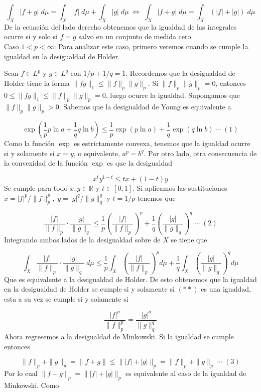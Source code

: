 \documentclass[12pt]{article}
\begin{document}
    \[\int_X |f+g|\; d\mu = \int_X |f|\; d\mu+\int_X |g|\; d\mu\;\Leftrightarrow\;\int_X |f+g|\; d\mu = \int_X(|f|+|g|)\;d\mu\]
    De la ecuaci\'on del lado derecho obtenemos que la igualdad de las integrales ocurre 
    si y solo si $f = g$ salvo en un conjunto de medida cero.
    \\

    Caso $1 < p < \infty$: Para analizar este caso, primero veremos cuando se cumple la 
    igualdad en la desigualdad de Holder.

    Sean $f\in L^p$ y $g\in L^q$ con $1/p+1/q = 1$. Recordemos que la desigualdad de Holder
    tiene la forma $\|fg\|_1 \leq \|f\|_p\|g\|_p$. Si $\|f\|_p\|g\|_p = 0$, entonces 
    $0 \leq \|fg\|_1 \leq \|f\|_p\|g\|_p = 0$, luego ocurre la igualdad. Supongamos que 
    $\|f\|_p\|g\|_p > 0$. Sabemos que la desigualdad de Young es equivalente a 

    \[\exp\left(\frac{1}{p}p\ln a+\frac{1}{q}q\ln b\right) \leq \frac{1}{p}\exp(p\ln a)+\frac{1}{q}\exp(q\ln b)\;\cdots\;(1)\]
    Como la funci\'on $\exp$ es estrictamente convexa, tenemos que la igualdad ocurre 
    si y solamente si $x = y$, o equivalente, $a^p = b^q$. Por otro lado, otra consecuencia 
    de la convexidad de la funci\'on $\exp$ es que la desigualdad
    
    \[x^ty^{1-t} \leq tx+(1-t)y\]
    Se cumple para todo $x,y\in \mathbb{R}$ y $t\in [0,1]$. Si aplicamos las sustituciones 
    $x = |f|^p/\|f\|_p^p,\; y = |g|^q/\|g\|_q^q$ y $t = 1/p$ tenemos que 

    \[\frac{|f|}{\|f\|_p}\cdot\frac{|g|}{\|g\|_q} \leq \frac{1}{p}\left(\frac{|f|}{\|f\|_p}\right)^p+\frac{1}{q}\left(\frac{|g|}{\|g\|_q}\right)^q\;\cdots \; (2)\]
    Integrando ambos lados de la desigualdad sobre de $X$ se tiene que 

    \[\int_X \frac{|f|}{\|f\|_p}\cdot\frac{|g|}{\|g\|_q}\;d\mu  \leq \frac{1}{p}\int_X \left(\frac{|f|}{\|f\|_p}\right)^pd\mu+\frac{1}{q}\int_X\left(\frac{|g|}{\|g\|_q}\right)^qd\mu\]
    Que es equivalente a la desigualdad de Holder. De esto obtenemos que la igualdad en la
    desigualdad de Holder se cumple si y solamente si $(**)$ es una igualdad, esta a su vez se 
    cumple si y solamente si

    \[\frac{|f|^p}{\|f\|_p^p} = \frac{|g|^q}{\|g\|_q^q}\]
    Ahora regresemos a la desigualdad de Minkowski. Si la igualdad se cumple entonces 

    \[\|f\|_p+\|g\|_p = \|f+g\| \leq \||f|+|g|\|_p = \|f\|_p+\|g\|_p\;\cdots\;(3)\]
    Por lo cual $\|f+g\|_p = \||f|+|g|\|_p$ es equivalente al caso de la igualdad de Minkowski.
    Como
\end{document}
